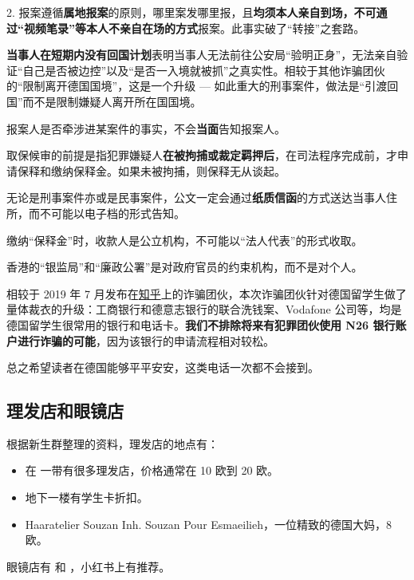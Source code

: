     2. 报案遵循\textbf{属地报案}的原则，哪里案发哪里报，且\textbf{均须本人亲自到场，不可通过``视频笔录''等本人不亲自在场的方式}报案。此事实破了``转接''之套路。

    \textbf{当事人在短期内没有回国计划}表明当事人无法前往公安局``验明正身''，无法亲自验证``自己是否被边控''以及``是否一入境就被抓''之真实性。相较于其他诈骗团伙的``限制离开德国国境''，这是一个升级 --- 如此重大的刑事案件，做法是``引渡回国''而不是限制嫌疑人离开所在国国境。

    报案人是否牵涉进某案件的事实，不会\textbf{当面}告知报案人。

    取保候审的前提是指犯罪嫌疑人\textbf{在被拘捕或裁定羁押后}，在司法程序完成前，才申请保释和缴纳保释金。如果未被拘捕，则保释无从谈起。

    无论是刑事案件亦或是民事案件，公文一定会通过\textbf{纸质信函}的方式送达当事人住所，而不可能以电子档的形式告知。

    缴纳``保释金''时，收款人是公立机构，不可能以``法人代表''的形式收取。

    香港的``银监局''和``廉政公署''是对政府官员的约束机构，而不是对个人。

    相较于 2019 年 7 月发布在\href{https://zhuanlan.zhihu.com/p/73981290}{知乎}上的诈骗团伙，本次诈骗团伙针对德国留学生做了量体裁衣的升级：工商银行和德意志银行的联合洗钱案、Vodafone 公司等，均是德国留学生很常用的银行和电话卡。\textbf{我们不排除将来有犯罪团伙使用 N26 银行账户进行诈骗的可能}，因为该银行的申请流程相对较松。

    总之希望读者在德国能够平平安安，这类电话一次都不会接到。

  \subsection{理发店和眼镜店}\label{subsec:理发店和眼镜店}

    根据新生群整理的资料，理发店的地点有：

    \begin{itemize}
      \item 在  一带有很多理发店，价格通常在 10 欧到 20 欧。
      \item {} 地下一楼有学生卡折扣。
      \item Haaratelier Souzan Inh. Souzan Pour Esmaeilieh，一位精致的德国大妈，8 欧。
    \end{itemize}

    眼镜店有  和 ，小红书上有推荐。

